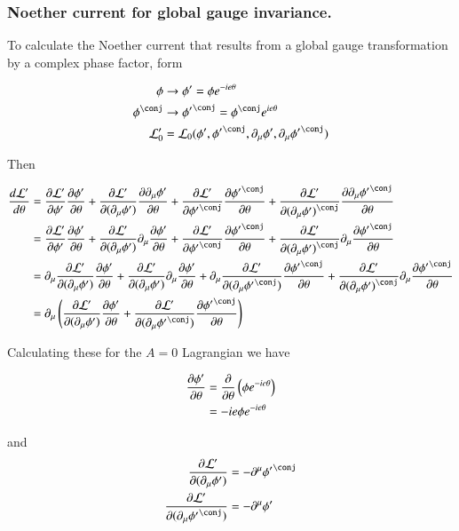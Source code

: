 \subsubsection{Noether current for global gauge invariance. }

To calculate the Noether current that results from a global gauge transformation by a complex phase factor, form

\begin{align*}
\phi &\rightarrow \phi' = \phi e^{-i e \theta} \\
\phi^\conj &\rightarrow {\phi'}^\conj = \phi^\conj e^{i e \theta} \\
\LL_0' &= \LL_0( \phi', {\phi'}^\conj, \partial_\mu \phi', \partial_\mu {\phi'}^\conj )
\end{align*}

Then 

\begin{align*}
\frac{d\LL'}{d\theta} 
&=
\PD{\phi'}{\LL'} \PD{\theta}{\phi'} 
+\PD{(\partial_\mu \phi')}{\LL'} \PD{\theta}{\partial_\mu \phi'}
+\PD{{\phi'}^\conj}{\LL'} \PD{\theta}{{\phi'}^\conj}
+\PD{(\partial_\mu {\phi')}^\conj}{\LL'} \PD{\theta}{\partial_\mu {\phi'}^\conj} \\
&=
\PD{\phi'}{\LL'} \PD{\theta}{\phi'} 
+\PD{(\partial_\mu \phi')}{\LL'} \partial_\mu \PD{\theta}{\phi'}
+\PD{{\phi'}^\conj}{\LL'} \PD{\theta}{{\phi'}^\conj}
+\PD{(\partial_\mu {\phi')}^\conj}{\LL'} \partial_\mu \PD{\theta}{{\phi'}^\conj} \\
&=
\partial_\mu \PD{(\partial_\mu \phi')}{\LL'} 
\PD{\theta}{\phi'} 
+\PD{(\partial_\mu \phi')}{\LL'} \partial_\mu \PD{\theta}{\phi'}
+
\partial_\mu \PD{(\partial_\mu {\phi'}^\conj)}{\LL'} 
\PD{\theta}{{\phi'}^\conj}
+\PD{(\partial_\mu {\phi')}^\conj}{\LL'} \partial_\mu \PD{\theta}{{\phi'}^\conj} \\
&=
\partial_\mu \left( 
\PD{(\partial_\mu \phi')}{\LL'} \PD{\theta}{\phi'} 
+
\PD{(\partial_\mu {\phi'}^\conj)}{\LL'} \PD{\theta}{{\phi'}^\conj}
\right)
\end{align*}

Calculating these for the $A=0$ Lagrangian we have

\begin{align*}
\frac{\partial {\phi'}}{\partial {\theta}} 
&= \frac{\partial {}}{\partial {\theta}} \left( \phi e^{-i e \theta} \right) \\
&= -i e \phi e^{-i e \theta} \\
\end{align*}

and
\begin{align*}
\PD{(\partial_\mu \phi')}{\LL'} &= - \partial^\mu {\phi'}^\conj \\
\PD{(\partial_\mu {\phi'}^\conj)}{\LL'} &= - \partial^\mu \phi' \\
\end{align*}

